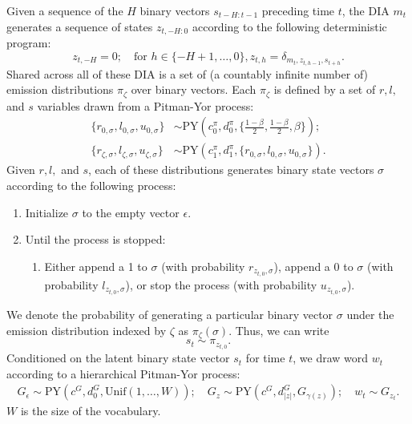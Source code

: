 \documentclass{article}
\newcommand{\PY}{\textrm{PY}}
\newcommand{\unif}{\textrm{Unif}}
\begin{document}
Given a sequence of the $H$ binary vectors $s_{t-H:t-1}$ preceding
time $t$, the DIA $m_t$ generates a sequence of states $z_{t,-H:0}$
according to the following deterministic program:
\begin{equation}
z_{t,-H} = 0; \quad
\textrm{for } h \in \{-H+1,\ldots,0\}, z_{t,h} = \delta_{m_t, z_{t,h-1}, s_{t+h}}.
\end{equation}
Shared across all of these DIA is a set of (a countably infinite
number of) emission distributions $\pi_{\zeta}$ over binary
vectors. Each $\pi_{\zeta}$ is defined by a set of $r, l,$ and $s$
variables drawn from a Pitman-Yor process:
\begin{equation}
\begin{split}
\{r_{0,\sigma}, l_{0,\sigma}, u_{0,\sigma}\} &\sim \PY(c_0^\pi, d^\pi_{0}, 
\{\frac{1-\beta}{2}, \frac{1-\beta}{2}, \beta\}); \\
\{r_{\zeta,\sigma}, l_{\zeta,\sigma}, u_{\zeta,\sigma}\} &\sim 
\PY(c_1^\pi, d^\pi_{1}, \{r_{0,\sigma}, l_{0,\sigma}, u_{0,\sigma}\}).
\end{split}
\end{equation}
Given $r, l,$ and $s$, each of these distributions generates binary
state vectors $\sigma$ according to the following process:
\begin{enumerate}
\item Initialize $\sigma$ to the empty vector $\epsilon$.
\item Until the process is stopped:
  \begin{enumerate}
  \item Either append a 1 to $\sigma$ (with probability $r_{z_{t,0}, \sigma}$),
    append a 0 to $\sigma$ (with probability $l_{z_{t,0}, \sigma}$), or
    stop the process (with probability $u_{z_{t,0},\sigma}$).
  \end{enumerate}
\end{enumerate}
We denote the probability of generating a particular binary vector
$\sigma$ under the emission distribution indexed by $\zeta$ as
$\pi_{\zeta}(\sigma)$. Thus, we can write
\begin{equation}
s_t \sim \pi_{z_{t,0}}.
\end{equation}
Conditioned on the latent binary state vector $s_t$ for time $t$, we
draw word $w_t$ according to a hierarchical Pitman-Yor process:
\begin{equation}
\begin{split}
G_{\epsilon} \sim \PY(c^G, d^G_{0},\unif(1,\ldots,W)); \quad
G_z \sim \PY(c^G, d^G_{|z|},G_{\gamma(z)}); \quad
w_t \sim G_{z_t}.
\end{split}
\end{equation}
$W$ is the size of the vocabulary.
\end{document}
